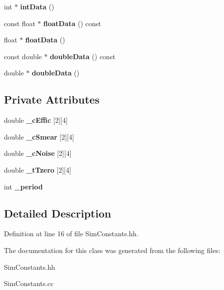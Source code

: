 \begin{DoxyCompactItemize}
\item 
int $\ast$ {\bfseries intData} ()\label{classTBTrack_1_1SimConstants_a6ed02c18a4bf75b1697b96115d4aded8}

\item 
const float $\ast$ {\bfseries floatData} () const \label{classTBTrack_1_1SimConstants_a2391df4a1c758c629a9b4d41c3b67575}

\item 
float $\ast$ {\bfseries floatData} ()\label{classTBTrack_1_1SimConstants_a174d1d454c38e840c51072a7517d1a6f}

\item 
const double $\ast$ {\bfseries doubleData} () const \label{classTBTrack_1_1SimConstants_a39f0137c046cfcf045501494a9d6bcb4}

\item 
double $\ast$ {\bfseries doubleData} ()\label{classTBTrack_1_1SimConstants_af88c1287049c36b8a0cd8e3dbc571ec6}

\end{DoxyCompactItemize}
\subsection*{Private Attributes}
\begin{DoxyCompactItemize}
\item 
double {\bfseries \_\-cEffic} [2][4]\label{classTBTrack_1_1SimConstants_af89d5f24d72339ca570c1c608d49416e}

\item 
double {\bfseries \_\-cSmear} [2][4]\label{classTBTrack_1_1SimConstants_a141d5c2bcd3f0fa0c147b97f70ed2658}

\item 
double {\bfseries \_\-cNoise} [2][4]\label{classTBTrack_1_1SimConstants_a6d7e1f44e008e7aa7c080a5b8bd1bd68}

\item 
double {\bfseries \_\-tTzero} [2][4]\label{classTBTrack_1_1SimConstants_a7a3697758c4dcfd8eb19d99679f7bea1}

\item 
int {\bfseries \_\-period}\label{classTBTrack_1_1SimConstants_a821162c3bd18ea4c010a705e82c8aa01}

\end{DoxyCompactItemize}


\subsection{Detailed Description}


Definition at line 16 of file SimConstants.hh.

The documentation for this class was generated from the following files:\begin{DoxyCompactItemize}
\item 
SimConstants.hh\item 
SimConstants.cc\end{DoxyCompactItemize}
